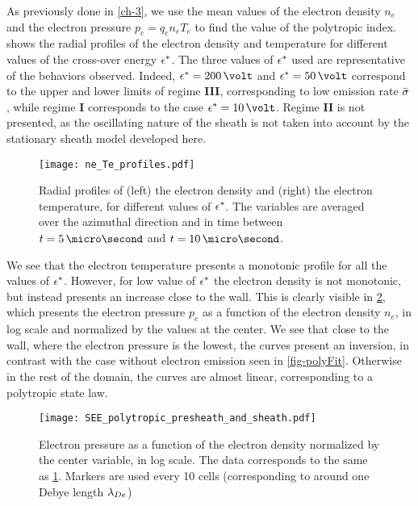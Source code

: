 As previously done in \cref{ch-3}, we use the mean values of the electron density $n_e$ and the electron pressure $ p_e = q_e n_e T_e$ to find the value of the polytropic index.
 shows the radial profiles of the electron density and temperature for different values of the cross-over energy $\epsilon^{*}$.
The three values of $\epsilon^{*}$ used are representative of the behaviors observed.
Indeed, $\crover=200\,\volt$ and $\crover=50\,\volt$ correspond to the upper and lower limits of regime {\bf III}, corresponding to low emission rate $ \bar{\sigma }$, while regime {\bf I} corresponds to the case $\crover=10\,\volt$.
Regime {\bf II} is not presented, as the oscillating nature of the sheath is not taken into account by the stationary sheath model developed here. 


\begin{figure}[!htb]
  \centering
  \texttt{[image: ne\_Te\_profiles.pdf]}
  \caption{Radial profiles of (left) the electron density and (right) the electron temperature, for different values of $\epsilon^{*}$. The variables are averaged over the azimuthal direction and in time between $t=5\,\micro\second$ and $t=10\,\micro\second$.  }
  \label{fig-radial_profiles_see}
\end{figure}

We see that the electron temperature presents a monotonic profile for all the values of $\epsilon^{*}$.
However, for low value of $\epsilon^{*}$ the electron density is not monotonic, but instead presents an increase close to the wall.
This is clearly visible in \cref{fig-log_pe-ne}, which presents the electron pressure $p_e$ as a function of the electron density $n_e$, in log scale and normalized by the values at the center.
We see that close to the wall, where the electron pressure is the lowest, the curves present an inversion, in contrast with the case without electron emission seen in \cref{fig-polyFit}.
Otherwise in the rest of the domain, the curves are almost linear, corresponding to a polytropic state law.

\begin{figure}[!htb]
  \centering
  \texttt{[image: SEE\_polytropic\_presheath\_and\_sheath.pdf]}
  \caption{Electron pressure as a function of the electron density normalized by the center variable, in log scale. The data corresponds to the same as \cref{fig-radial_profiles_see}. Markers are used every 10 cells (corresponding to around one Debye length $\lambda_{De}$)}
  \label{fig-log_pe-ne}
\end{figure}

